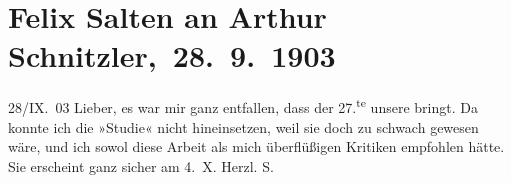 

         
         \renewcommand{\erwaehntePersonen}{Personen: Felix Salten}
         \renewcommand{\erwaehnteInstitutionen}{Institutionen: Die Zeit}
         \renewcommand{\erwaehnteOrte}{Orte: Wien}
         \renewcommand{\erwaehnteWerke}{Werke: Die Zeit, Studie}
               \section[ Felix Salten an Arthur Schnitzler, 28. 9. 1903]{ Felix Salten an Arthur Schnitzler, 28. 9. 1903}\nopagebreak{}\rehead{ }\begin{ledgroupsized}[t]{13cm}\normalsize\beginnumbering{} \toendnotes[C]{\smallbreak\pagebreak[2]} 
\toendnotes[C]{\smallbreak}\pstart
           \raggedleft{}{\pb}28/IX. 03\pend
           \pstart
           Lieber, es war mir ganz entfallen, dass der 27.\textsuperscript{te} unsere \label{K_L03345-1v}\label{K_L03345-1h} bringt. Da
               konnte ich die »Studie« nicht hineinsetzen, weil
               sie doch zu schwach gewesen wäre, und ich sowol diese Arbeit als mich überflüßigen Kritiken empfohlen hätte. Sie
               erscheint ganz sicher am 4. X.\pend
           \pstart Herzl. \spacefill\mbox{S.}\pend{}
         
         \endnumbering{}\end{ledgroupsized}  \newcommand{\dateiname}{L03345}\newcommand{\titel}{Felix Salten an Arthur Schnitzler, 28. 9. 1903}\newcommand{\editorInnen}{Martin Anton Müller und Laura Untner}
      